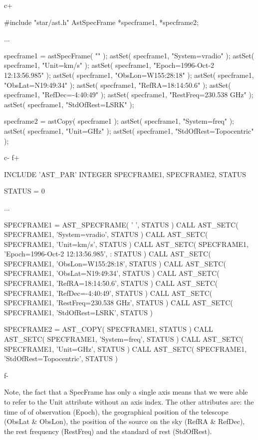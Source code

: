 \documentclass[twoside,11pt]{starlink}
\begin{document}
c+
\small
\begin{terminalv}
#include "star/ast.h"
AstSpecFrame *specframe1, *specframe2;

...

specframe1 = astSpecFrame( "" );
astSet( specframe1, "System=vradio" );
astSet( specframe1, "Unit=km/s" );
astSet( specframe1, "Epoch=1996-Oct-2 12:13:56.985" );
astSet( specframe1, "ObsLon=W155:28:18" );
astSet( specframe1, "ObsLat=N19:49:34" );
astSet( specframe1, "RefRA=18:14:50.6" );
astSet( specframe1, "RefDec=-4:40:49" );
astSet( specframe1, "RestFreq=230.538 GHz" );
astSet( specframe1, "StdOfRest=LSRK" );

specframe2 = astCopy( specframe1 );
astSet( specframe1, "System=freq" );
astSet( specframe1, "Unit=GHz" );
astSet( specframe1, "StdOfRest=Topocentric" );

\end{terminalv}
\normalsize
c-
f+
\small
\begin{terminalv}
      INCLUDE 'AST_PAR'
      INTEGER SPECFRAME1, SPECFRAME2, STATUS

      STATUS = 0

      ...

      SPECFRAME1 = AST_SPECFRAME( ' ', STATUS )
      CALL AST_SETC( SPECFRAME1, 'System=vradio', STATUS )
      CALL AST_SETC( SPECFRAME1, 'Unit=km/s', STATUS )
      CALL AST_SETC( SPECFRAME1, 'Epoch=1996-Oct-2 12:13:56.985',
     :               STATUS )
      CALL AST_SETC( SPECFRAME1, 'ObsLon=W155:28:18', STATUS )
      CALL AST_SETC( SPECFRAME1, 'ObsLat=N19:49:34', STATUS )
      CALL AST_SETC( SPECFRAME1, 'RefRA=18:14:50.6', STATUS )
      CALL AST_SETC( SPECFRAME1, 'RefDec=-4:40:49', STATUS )
      CALL AST_SETC( SPECFRAME1, 'RestFreq=230.538 GHz', STATUS )
      CALL AST_SETC( SPECFRAME1, 'StdOfRest=LSRK', STATUS )

      SPECFRAME2 = AST_COPY( SPECFRAME1, STATUS )
      CALL AST_SETC( SPECFRAME1, 'System=freq', STATUS )
      CALL AST_SETC( SPECFRAME1, 'Unit=GHz', STATUS )
      CALL AST_SETC( SPECFRAME1, 'StdOfRest=Topocentric', STATUS )

\end{terminalv}
\normalsize
f-

Note, the fact that a SpecFrame has only a single axis means that we were
able to refer to the Unit attribute without an axis index. The other
attributes are: the time of of observation (Epoch), the geographical
position of the telescope (ObsLat \& ObsLon), the position of the source
on the sky (RefRA \& RefDec), the rest frequency (RestFreq) and the
standard of rest (StdOfRest).
\end{document}
